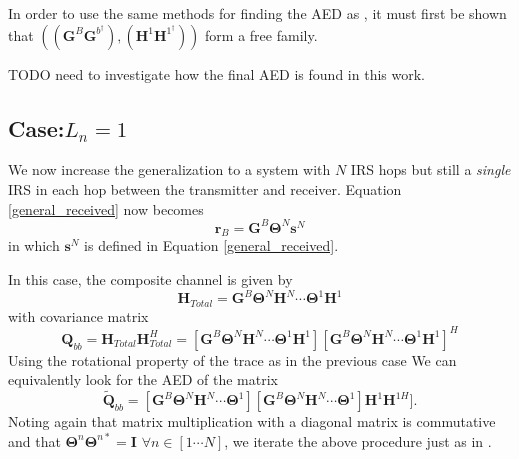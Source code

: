 \documentclass[12pt,a4paper]{report}
\begin{document}
In order to use the same methods for finding the AED as \cite[Section 4.10]{muller2013applications}, it must first be shown that $\left(\left( \mathbf{G}^{B}\mathbf{G}^{b^\dagger }\right)
,\left( \mathbf{H}^{1}\mathbf{H}^{1^\dagger} \right)
\right)$
form a free family. 
\par
TODO need to investigate how the final AED is found in this work.

\subsection{Case:$L_n=1$}
We now increase the generalization to a system with $N$ IRS hops but still a \emph{single} IRS in each hop between the transmitter and receiver. 
Equation \ref{general_received} now becomes 
\begin{equation}\label{}
\mathbf{r}_{B} =  \mathbf{G}^{B}\boldsymbol{\Theta}^{N}\mathbf{s}^{N}
\end{equation}
in which $\mathbf{s}^{N}$ is defined in Equation \ref{general_received}.

In this case, the composite channel is given by 
\begin{equation}
\mathbf{H}_{Total} = \mathbf{G}^{B}\boldsymbol{\Theta}^{N}\mathbf{H}^{N} \cdots \boldsymbol{\Theta}^{1}\mathbf{H}^{1}
\end{equation}
with covariance matrix 
\begin{equation}\label{polynomial_terms}
\mathbf{Q}_{bb} = \mathbf{H}_{Total}\mathbf{H}_{Total}^H = [\mathbf{G}^{B}\boldsymbol{\Theta}^{N}\mathbf{H}^{N} \cdots \boldsymbol{\Theta}^{1}\mathbf{H}^{1}][\mathbf{G}^{B}\boldsymbol{\Theta}^{N}\mathbf{H}^{N} \cdots \boldsymbol{\Theta}^{1}\mathbf{H}^{1}]^H
\end{equation}
Using the rotational property of the trace as in the previous case
We can equivalently look for the AED of the matrix 
\begin{equation}
\tilde{\mathbf{Q}}_{bb} = [\mathbf{G}^{B}\boldsymbol{\Theta}^{N}\mathbf{H}^{N} \cdots \boldsymbol{\Theta}^{1}][\mathbf{G}^{B}\boldsymbol{\Theta}^{N}\mathbf{H}^{N} \cdots \boldsymbol{\Theta}^{1}]\mathbf{H}^{1}\mathbf{H}^{1H}].
\end{equation}
Noting again that matrix multiplication with a diagonal matrix is commutative and that $\boldsymbol{\Theta}^{n}\boldsymbol{\Theta}^{n*} = \mathbf{I}$ $\forall n \in [1\cdots N]$, we iterate the above procedure just as in \cite[Section 4.10]{muller2013applications}.
\end{document}
